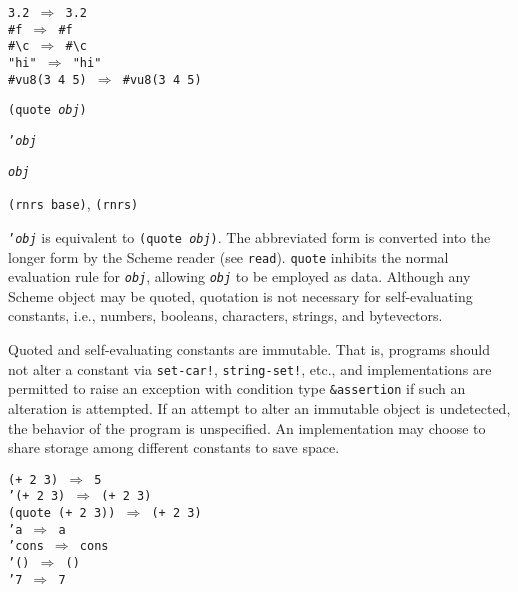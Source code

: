 \begin{alltt}
3.2 \(\Rightarrow\) 3.2
\#{}f \(\Rightarrow\) \#{}f
\#{}\textbackslash{}c \(\Rightarrow\) \#{}\textbackslash{}c
"hi" \(\Rightarrow\) "hi"
\#{}vu8(3 4 5) \(\Rightarrow\) \#{}vu8(3 4 5)
\end{alltt}

\begin{description}

\label{objects_s2}\item[syntax] \texttt{(quote \textit{obj})}



\item[syntax] \texttt{'\textit{obj}}



\item[returns] \texttt{\textit{obj}}


\item[libraries] \texttt{(rnrs base)}, \texttt{(rnrs)}
\end{description}

\texttt{'\textit{obj}} is equivalent to \texttt{(quote \textit{obj})}.
The abbreviated form is converted into the longer form by the Scheme
reader (see \texttt{read}).
\texttt{quote} inhibits the normal evaluation rule for
\texttt{\textit{obj}}, allowing \texttt{\textit{obj}} to be employed as \label{objects_s3}data.
Although any Scheme object may be quoted, quotation is not necessary
for self-evaluating \label{objects_s4}constants, i.e., numbers, booleans,
characters, strings, and bytevectors.

Quoted and self-evaluating constants are immutable.
That is, programs should not alter a constant via \texttt{set-car!},
\texttt{string-set!}, etc., and implementations are permitted to raise
an exception with condition type \texttt{\&{}assertion} if such an
alteration is attempted.
If an attempt to alter an immutable object is undetected, the behavior of
the program is unspecified.
An implementation may choose to share storage among different
constants to save space.


\begin{alltt}
(+ 2 3) \(\Rightarrow\) 5
'(+ 2 3) \(\Rightarrow\) (+ 2 3)
(quote (+ 2 3)) \(\Rightarrow\) (+ 2 3)
'a \(\Rightarrow\) a
'cons \(\Rightarrow\) cons
'() \(\Rightarrow\) ()
'7 \(\Rightarrow\) 7
\end{alltt}

